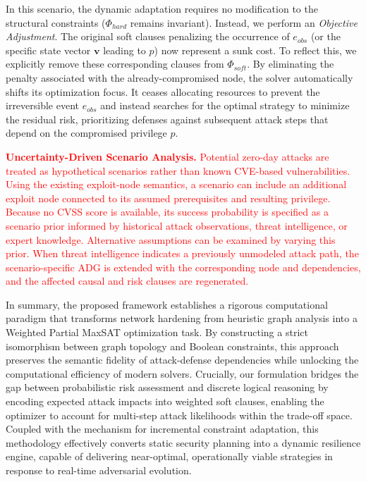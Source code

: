\documentclass[conference]{IEEEtran}
\theoremstyle{definition} %
\theoremstyle{plain} %
\begin{document}
In this scenario, the dynamic adaptation requires no modification to the structural constraints ($\Phi_{hard}$ remains invariant). Instead, we perform an \textit{Objective Adjustment}. The original soft clauses penalizing the occurrence of $e_{obs}$ (or the specific state vector $\mathbf{v}$ leading to $p$) now represent a sunk cost. To reflect this, we explicitly remove these corresponding clauses from $\Phi_{soft}$. By eliminating the penalty associated with the already-compromised node, the solver automatically shifts its optimization focus. It ceases allocating resources to prevent the irreversible event $e_{obs}$ and instead searches for the optimal strategy to minimize the residual risk, prioritizing defenses against subsequent attack steps that depend on the compromised privilege $p$.

\textcolor{red}{\textbf{Uncertainty-Driven Scenario Analysis.} Potential zero-day attacks are treated as hypothetical scenarios rather than known CVE-based vulnerabilities. Using the existing exploit-node semantics, a scenario can include an additional exploit node connected to its assumed prerequisites and resulting privilege. Because no CVSS score is available, its success probability is specified as a scenario prior informed by historical attack observations, threat intelligence, or expert knowledge. Alternative assumptions can be examined by varying this prior. When threat intelligence indicates a previously unmodeled attack path, the scenario-specific ADG is extended with the corresponding node and dependencies, and the affected causal and risk clauses are regenerated.}

In summary, the proposed framework establishes a rigorous computational paradigm that transforms network hardening from heuristic graph analysis into a Weighted Partial MaxSAT optimization task. By constructing a strict isomorphism between graph topology and Boolean constraints, this approach preserves the semantic fidelity of attack-defense dependencies while unlocking the computational efficiency of modern solvers. Crucially, our formulation bridges the gap between probabilistic risk assessment and discrete logical reasoning by encoding expected attack impacts into weighted soft clauses, enabling the optimizer to account for multi-step attack likelihoods within the trade-off space. Coupled with the mechanism for incremental constraint adaptation, this methodology effectively converts static security planning into a dynamic resilience engine, capable of delivering near-optimal, operationally viable strategies in response to real-time adversarial evolution.
\end{document}
